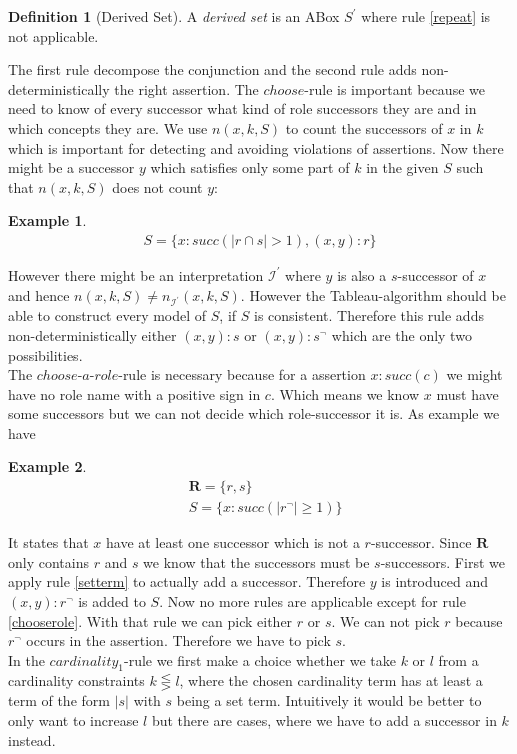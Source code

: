 \documentclass[a4paper,11pt]{scrartcl}
\theoremstyle{break}
\theoremstyle{definition}
\newtheorem{mydef}{Definition}
\newtheorem{ex}{Example}
\begin{document}
\begin{mydef}[Derived Set]
A \textit{derived set} is an ABox $S^\prime$ where rule \ref{repeat} is not applicable.
\end{mydef}
The first rule decompose the conjunction and the second rule adds non-deterministically the right assertion. The $choose$-rule is important because we need to know of every successor what kind of role successors they are and in which concepts they are. We use $n(x,k,S)$ to count the successors of $x$ in $k$ which is important for detecting and avoiding violations of assertions. Now there might be a successor $y$ which satisfies only some part of $k$ in the given $S$ such that $n(x,k,S)$ does not count $y$:
\begin{ex}
\begin{align*}
S=\{x:succ(|r\cap s|>1), (x,y):r\}
\end{align*}
\end{ex}
However there might be an interpretation $\mathcal{I^\prime}$ where $y$ is also a $s$-successor of $x$ and hence $n(x,k,S)\neq n_{\mathcal{I}^\prime}(x,k,S)$. However the Tableau-algorithm should be able to construct every model of $S$, if $S$ is consistent. Therefore this rule adds non-deterministically either $(x,y):s$ or $(x,y):s^\neg$ which are the only two possibilities.\\
The $choose$-$a$-$role$-rule is necessary because for a assertion $x:succ(c)$ we might have no role name with a positive sign in $c$. Which means we know $x$ must have some successors but we can not decide which role-successor it is. As example we have
\begin{ex}
\begin{align*}
&\mathbf{R}=\{r,s\}\\
&S=\{x:succ(|r^\neg|\geq 1)\}
\end{align*} 
\end{ex}
It states that $x$ have at least one successor which is not a $r$-successor. Since $\mathbf{R}$ only contains $r$ and $s$ we know that the successors must be $s$-successors. First we apply rule \ref{setterm} to actually add a successor. Therefore $y$ is introduced and $(x,y):r^\neg$ is added to $S$. Now no more rules are applicable except for rule \ref{chooserole}. With that rule we can pick either $r$ or $s$. We can not pick $r$ because $r^\neg$ occurs in the assertion. Therefore we have to pick $s$.\\
In the $cardinality_1$-rule we first make a choice whether we take $k$ or $l$ from a cardinality constraints $k\lesseqgtr l$, where the chosen cardinality term has at least a term of the form $|s|$ with $s$ being a set term. Intuitively it would be better to only want to increase $l$ but there are cases, where we have to add a successor in $k$ instead.
\end{document}
